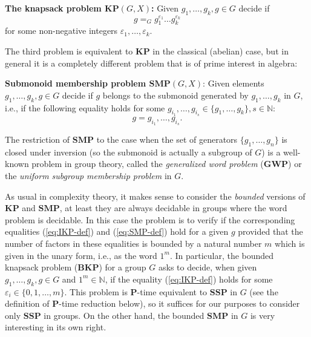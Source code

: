 \documentclass[10pt]{amsart}
\theoremstyle{definition}
\def\P{{\mathbf{P}}}
\def\SSP{{\mathbf{SSP}}}
\def\SMP{{\mathbf{SMP}}}
\def\BKP{{\mathbf{BKP}}}
\def\KP{{\mathbf{KP}}}
\def\IKP{{\mathbf{IKP}}}
\def\GWP{{\mathbf{GWP}}}
\begin{document}
\medskip
\noindent
{\bf The knapsack problem $\KP(G,X)$\index{$\KP(G,X)$}:}  Given $g_1,\ldots,g_k,g\in G$
decide if
\begin{equation}\label{eq:IKP-def}
g =_G g_1^{\varepsilon_1} \ldots g_k^{\varepsilon_k}
\end{equation}
for some  non-negative integers $\varepsilon_1,\ldots,\varepsilon_k$.


\medskip


The third problem is equivalent to $\KP$ in the classical (abelian) case, but in general it is a completely different problem that is of prime  interest in algebra:

\medskip
\noindent
{\bf Submonoid membership problem $\mathbf{SMP}(G,X)$\index{$\SMP(G,X)$}}:  Given elements $g_1,\ldots,g_k,g\in G$
decide if $g$ belongs to the submonoid generated by $g_1, \ldots, g_k$ in $G$, i.e., if the following equality holds for some $g_{i_1}, \ldots, g_{i_s} \in \{g_1, \ldots, g_k\}, s \in \mathbb{N}$:
\begin{equation}\label{eq:SMP-def}
g = g_{i_1}, \ldots, g_{i_s}.
\end{equation}

\medskip
The restriction of $\SMP$ to the case when the set of generators $\{g_1, \ldots,g_n\}$ is closed under inversion (so the submonoid is actually a subgroup of $G$) is  a well-known problem in group theory, called the {\em generalized word problem} ($\GWP$) or the {\em uniform subgroup membership problem} in $G$.

As usual in complexity theory, it makes sense to consider the {\em bounded} versions of $\KP$ and $\SMP$, at least they are always decidable in groups where the word problem is decidable. In this case the problem is to verify  if the corresponding equalities (\ref{eq:IKP-def}) and  (\ref{eq:SMP-def}) hold for a given $g$ provided that the number of factors in these equalities  is bounded by a natural number $m$ which is given in the unary form, i.e., as the word $1^m$. In particular, the bounded knapsack problem ($\BKP$) for a group $G$ asks to decide, when  given $g_1,\ldots,g_k,g\in G$ and $1^m\in\mathbb N$, if the equality (\ref{eq:IKP-def}) holds for some
$\varepsilon_i \in \{0,1, \ldots, m \}$.
This problem  is  $\P$-time equivalent to  $\SSP$ in $G$ (see the definition of $\P$-time reduction below), so it suffices for our purposes to consider only $\SSP$ in groups.
On the other hand,  the bounded $\SMP$ in $G$ is very interesting in its own right.
\end{document}
